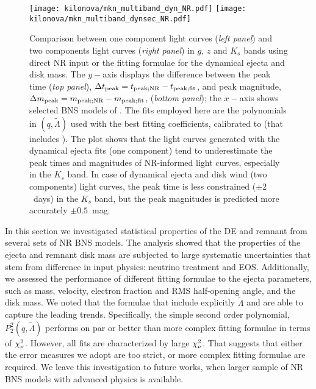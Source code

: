 \begin{figure*}[t]
    \centering 
    \texttt{[image: kilonova/mkn\_multiband\_dyn\_NR.pdf]}
    \texttt{[image: kilonova/mkn\_multiband\_dynsec\_NR.pdf]}
    \caption{
        Comparison between one component light curves (\textit{left panel}) and
        two components light curves (\textit{right panel}) in $g$, $z$ and $K_s$
        bands using direct NR input or the fitting formulae for the
        dynamical ejecta and disk mass. 
        The $y-$axis displays the difference between the peak time (\textit{top panel}), $\Delta t_{\rm peak} = t_{\rm peak; NR} - t_{\rm peak; fit}$, and peak magnitude, $\Delta m_{\rm peak} = m_{\rm peak; NR} - m_{\rm peak; fit}$, (\textit{bottom panel});
        the $x-$axis shows selected BNS models of \DSrefset{}.
        The fits employed here are the polynomials in $(q,\tilde{\Lambda})$ used with the 
        best fitting coefficients, calibrated to \DSheatcool{} (that includes \DSrefset{}).
        The plot shows that 
        the light curves generated with the dynamical ejecta fits (one
        component) tend to underestimate the peak times and magnitudes
        of NR-informed light curves, especially in the $K_s$ band. In case of dynamical ejecta and disk wind (two
        components) light curves, the peak
        time is less constrained ($\pm 2$~days) in the $K_s$ band, but the
        peak magnitudes is predicted more accurately $\pm0.5$~mag. }
    \label{fig:mkn_example}
\end{figure*}

In this section we investigated statistical properties of the \ac{DE} and remnant from 
several sets of \ac{NR} \ac{BNS} models. 
The analysis showed that the properties of the ejecta and remnant disk mass are subjected 
to large systematic uncertainties that stem from difference in input physics: neutrino 
treatment and \ac{EOS}.
Additionally, we assessed the performance of different fitting formulae to the ejecta 
parameters, such as mass, velocity, electron fraction and \ac{RMS} half-opening angle, and the 
disk mass. We noted that the formulae that include explicitly $\tilde{\Lambda}$ and \mr{} 
are able to capture the leading trends. Specifically, the simple second order polynomial, 
$P_2^2(q,\tilde{\Lambda})$ performs on par or better than more complex fitting formulae 
in terms of $\chi_{\nu}^2$.
However, all fits are characterized by large $\chi_{\nu}^2$. That suggests that either the error measures 
we adopt are too strict, or more complex fitting formulae are required. We leave this 
investigation to future works, when larger sample of \ac{NR} \ac{BNS} models with advanced 
physics is available.

